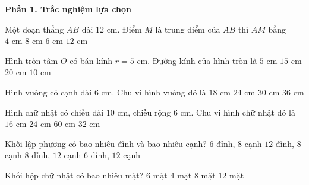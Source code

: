 \textbf{Phần 1. Trắc nghiệm lựa chọn}

\begin{ex} %
Một đoạn thẳng $AB$ dài $12\text{ cm}$. Điểm $M$ là trung điểm của $AB$ thì $AM$ bằng
\choice
{$4\text{ cm}$}
{$8\text{ cm}$}
{\True $6\text{ cm}$}
{$12\text{ cm}$}
\end{ex}

\begin{ex} %
Hình tròn tâm $O$ có bán kính $r = 5\text{ cm}$. Đường kính của hình tròn là
\choice
{$5\text{ cm}$}
{$15\text{ cm}$}
{$20\text{ cm}$}
{\True $10\text{ cm}$}
\end{ex}

\begin{ex} %
Hình vuông có cạnh dài $6\text{ cm}$. Chu vi hình vuông đó là
\choice
{$18\text{ cm}$}
{\True $24\text{ cm}$}
{$30\text{ cm}$}
{$36\text{ cm}$}
\end{ex}

\begin{ex} %
Hình chữ nhật có chiều dài $10\text{ cm}$, chiều rộng $6\text{ cm}$. Chu vi hình chữ nhật đó là
\choice
{$16\text{ cm}$}
{$24\text{ cm}$}
{$60\text{ cm}$}
{\True $32\text{ cm}$}
\end{ex}

\begin{ex} %
Khối lập phương có bao nhiêu đỉnh và bao nhiêu cạnh?
\choice
{$6$ đỉnh, $8$ cạnh}
{$12$ đỉnh, $8$ cạnh}
{\True $8$ đỉnh, $12$ cạnh}
{$6$ đỉnh, $12$ cạnh}
\end{ex}

\begin{ex} %
Khối hộp chữ nhật có bao nhiêu mặt?
\choice
{\True $6$ mặt}
{$4$ mặt}
{$8$ mặt}
{$12$ mặt}
\end{ex}

